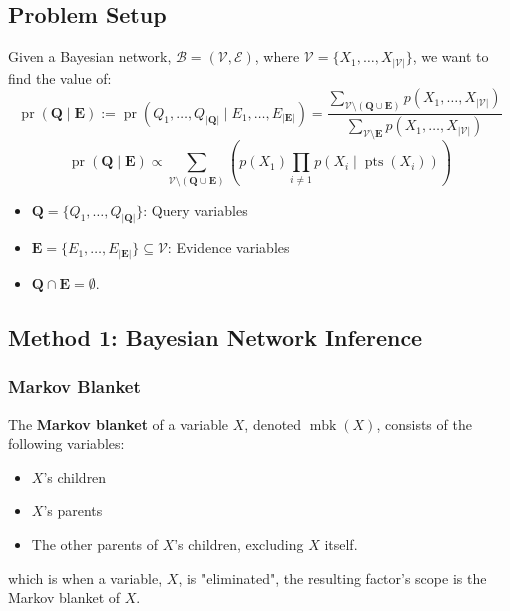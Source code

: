 \subsection{Problem Setup}
\begin{definition}
    Given a Bayesian network, $\mathcal{B} = (\mathcal{V}, \mathcal{E})$, where $\mathcal{V} = \{X_1, \dots, X_{|\mathcal{V}|}\}$, we want to find the value of:
    \[
    \operatorname{pr}(\mathbf{Q} \mid \mathbf{E}) := \operatorname{pr}(Q_1, \dots, Q_{|\mathbf{Q}|} \mid E_1, \dots, E_{|\mathbf{E}|}) = \frac{\sum_{\mathcal{V} \setminus (\mathbf{Q} \cup \mathbf{E})} p(X_1, \dots, X_{|\mathcal{V}|})}
    {\sum_{\mathcal{V} \setminus \mathbf{E}} p(X_1, \dots, X_{|\mathcal{V}|})}
    \]
    \[
    \operatorname{pr}(\mathbf{Q} \mid \mathbf{E}) \propto 
    \sum_{\mathcal{V} \setminus (\mathbf{Q} \cup \mathbf{E})} 
    \left( p(X_1) \prod_{i \neq 1} p(X_i \mid \operatorname{pts}(X_i)) \right)
    \]


    \begin{itemize}
        \item $\mathbf{Q} = \{Q_1, \dots, Q_{|\mathbf{Q}|}\}$: Query variables
        \item $\mathbf{E} = \{E_1, \dots, E_{|\mathbf{E}|}\} \subseteq \mathcal{V}$: Evidence variables
        \item $\mathbf{Q} \cap \mathbf{E} = \emptyset$.
    \end{itemize}
\end{definition}

\subsection{Method 1: Bayesian Network Inference}

\subsubsection{Markov Blanket}
\begin{definition} 
    The \textbf{Markov blanket} of a variable $X$, denoted $\operatorname{mbk}(X)$, consists of the following variables:
    \begin{itemize}
        \item $X$'s children
        \item $X$'s parents
        \item The other parents of $X$'s children, excluding $X$ itself.
    \end{itemize}
    which is when a variable, $X$, is "eliminated", the resulting factor's scope is the Markov blanket of $X$.
\end{definition}

